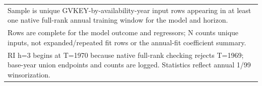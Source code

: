 \begin{tabular}{l*{3}{ccccc}}
\hline\hline
\multicolumn{16}{l}{\footnotesize Sample is unique GVKEY-by-availability-year input rows appearing in at least one native full-rank annual training window for the model and horizon.}\\
\multicolumn{16}{l}{\footnotesize Rows are complete for the model outcome and regressors; N counts unique inputs, not expanded/repeated fit rows or the annual-fit coefficient summary.}\\
\multicolumn{16}{l}{\footnotesize RI h=3 begins at T=1970 because native full-rank checking rejects T=1969; base-year union endpoints and counts are logged. Statistics reflect annual 1/99 winsorization.}\\
\end{tabular}

